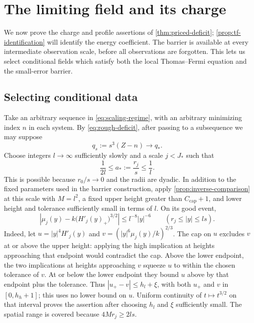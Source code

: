 \section{The limiting field and its charge}\label{sec:limit}

We now prove the charge and profile assertions of
\cref{thm:priced-deficit}; \cref{prop:tf-identification} will identify
the energy coefficient.  The barrier is available at
every intermediate observation scale, before all observations are
forgotten.  This lets us select conditional fields which satisfy both
the local Thomas--Fermi equation and the small-error barrier.

\subsection{Selecting conditional data}

Take an arbitrary sequence in \cref{eq:scaling-regime}, with an
arbitrary minimizing index $n$ in each system.  By
\cref{eq:rough-deficit}, after passing to a subsequence we may suppose
\[
 q_s:=s^3(Z-n)\longrightarrow q_*.
\]
Choose integers $l\to\infty$ sufficiently slowly and a scale $j<J_*$
such that
\begin{equation}\label{eq:intermediate-scale}
 \frac1{2l}\le a_*:=\frac{r_j}{s}\le\frac1l.
\end{equation}
This is possible because $r_0/s\to0$ and the radii are dyadic.
In addition to the fixed parameters used in the barrier construction,
apply \cref{prop:inverse-comparison} at this scale with $M=l^2$, a
fixed upper height greater than $C_{\mathrm{cap}}+1$, and lower height
and tolerance sufficiently small in terms of $l$.  On its good event,
\begin{equation}\label{eq:local-tf-approximation}
 \left|\mu_j(y)-k\bigl(H'_j(y)_+\bigr)^{3/2}\right|
 \le l^{-8}|y|^{-6}
 \qquad(r_j\le|y|\le ls).
\end{equation}
Indeed, let $u=|y|^4H'_j(y)$ and
$v=(|y|^6\mu_j(y)/k)^{2/3}$.  The cap on $u$ excludes $v$ at or
above the upper height: applying the high implication at heights
approaching that endpoint would contradict the cap.  Above the
lower endpoint, the two implications at heights approaching $v$
squeeze $u$ to within the chosen tolerance of $v$.  At or below
the lower endpoint they bound $u$ above by that endpoint plus the
tolerance.  Thus $|u_+-v|\le h_l+\xi$, with both $u_+$ and $v$ in
$[0,h_h+1]$; this uses no lower bound on $u$.
Uniform continuity of $t\mapsto t^{3/2}$ on that interval proves
the assertion after choosing $h_l$ and $\xi$ sufficiently small.
The spatial range is covered because
$4Mr_j\ge2ls$.

